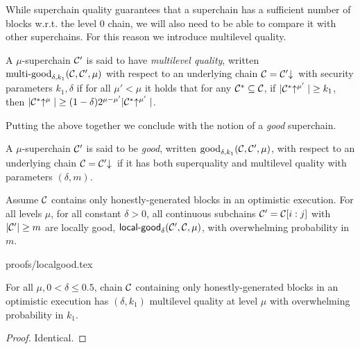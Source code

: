 While superchain quality guarantees that a superchain has a sufficient number
of blocks w.r.t. the level 0 chain, we will also need to be able to compare
it with other superchains. For this reason we introduce multilevel quality.

\begin{definition}
A $\mu$-superchain $\mathcal{C}'$ is said to have \textit{multilevel quality}, written
$\textnormal{multi-good}_{\delta, k_1}(\mathcal{C}, \mathcal{C}', \mu)$ with respect to an
underlying chain $\mathcal{C} = \mathcal{C}'\negthickspace\downarrow\,$ with security parameters $k_1,
\delta$ if for all $\mu' < \mu$ it holds that for any $\mathcal{C}^* \subseteq \mathcal{C}$,
if $|\mathcal{C}^*\negthickspace\uparrow^{\mu'}| \geq k_1$, then $|\mathcal{C}^*\negthickspace\uparrow^{\mu}| \geq (1 -
\delta)2^{\mu - \mu'}|\mathcal{C}^*\negthickspace\uparrow^{\mu'}|$.
\end{definition}


Putting the above together we conclude with the notion of a {\em good}
superchain.

\begin{definition}
\label{lem.good}
A $\mu$-superchain $\mathcal{C}'$
is said to be \textit{good}, written $\textnormal{good}_{\delta, k_1}(\mathcal{C},
\mathcal{C}', \mu)$, with respect to an underlying chain $\mathcal{C} = \mathcal{C}'\negthickspace\downarrow\,$
if it has both superquality and multilevel quality with parameters $(\delta,
m)$.
\end{definition}

\begin{lemma}
\label{lem.localgood}
Assume $\mathcal{C}$ contains only honestly-generated blocks in an optimistic
execution. For all levels $\mu$, for all constant $\delta > 0$, all continuous
subchains $\mathcal{C}' = \mathcal{C}[i:j]$ with $|\mathcal{C}'| \geq m$ are locally good,
$\textsf{local-good}_{\delta}(\mathcal{C}', \mathcal{C}, \mu)$, with overwhelming
probability in $m$.
\end{lemma}
{proofs/localgood.tex}

\begin{lemma}\label{lem.multilevel}
For all $\mu, 0 < \delta \leq 0.5$, chain $\mathcal{C}$ containing only
honestly-generated blocks in an optimistic execution has $(\delta, k_1)$
multilevel quality at level $\mu$ with overwhelming probability in $k_1$.
\end{lemma}
\begin{proof}
Identical.
\Qed
\end{proof}

